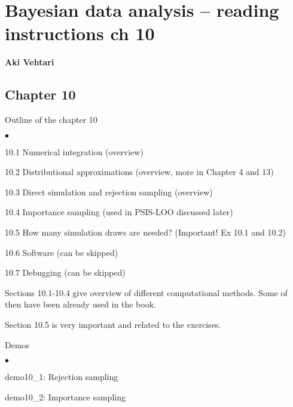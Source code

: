 \documentclass[a4paper,11pt,english]{article}
\begin{document}
\thispagestyle{empty}

\section*{Bayesian data analysis -- reading instructions ch 10} 
\smallskip
{\bf Aki Vehtari}
\smallskip

\subsection*{Chapter 10}

Outline of the chapter 10
\begin{list}{$\bullet$}{\parsep=0pt\itemsep=2pt}
\item 10.1 Numerical integration (overview)
\item 10.2 Distributional approximations (overview, more in Chapter 4 and 13)
\item 10.3 Direct simulation and rejection sampling (overview)
\item 10.4 Importance sampling (used in PSIS-LOO discussed later)
\item 10.5 How many simulation draws are needed? (Important! Ex 10.1 and 10.2)
\item 10.6 Software (can be skipped)
\item 10.7 Debugging (can be skipped)
\end{list}

Sections 10.1-10.4 give overview of different computational
methods. Some of then have been already used in the book.

Section 10.5 is very important and related to the exercises.

Demos
\begin{list}{$\bullet$}{\parsep=0pt\itemsep=2pt}
\item demo10\_1: Rejection sampling
\item demo10\_2: Importance sampling
\end{list}
\end{document}
